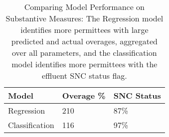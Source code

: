 \begin{table}[ht]
\centering
\begin{tabular}{lll}
  \hline
Model & Overage \% & SNC Status \\ 
  \hline
Regression & 210 & 87\% \\ 
  Classification & 116 & 97\% \\ 
   \hline
\end{tabular}
\caption{ Comparing Model Performance on Substantive Measures: The Regression model identifies more permittees with large predicted and actual overages, aggregated over all parameters, and the classification model identifies more permittees with the effluent SNC status flag.} 
\label{tab:performance_substantive}
\end{table}
